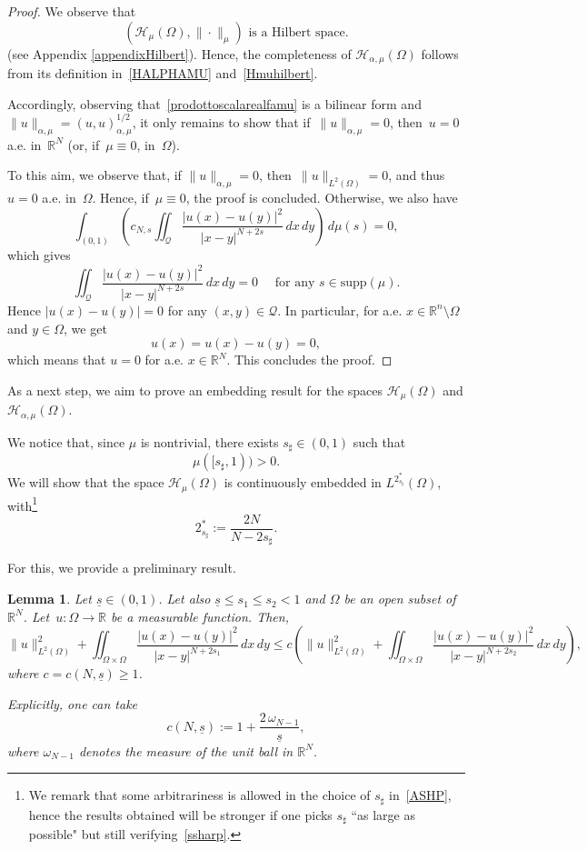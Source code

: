 \documentclass[12pt,a4paper,intlimits,sumlimits]{amsart}
\def \R {\mathbb{R}}
\def \Q {\mathcal Q}
\theoremstyle{definition}
\theoremstyle{plain}
\newtheorem{lemma}[definition]{Lemma}
\numberwithin{equation}{section}
\renewcommand{\le}{\leqslant}
\renewcommand{\ge}{\geqslant}
\begin{document}
\begin{proof}
We observe that
\begin{equation}\label{Hmuhilbert}
(\mathcal{H}_\mu(\Omega), \|\cdot\|_{\mu}) \mbox{ is a Hilbert space.}
\end{equation}
(see Appendix \ref{appendixHilbert}).
Hence, the completeness of $\mathcal{H}_{\alpha,\mu}(\Omega)$ follows from its
definition in~\eqref{HALPHAMU} and~\ref{Hmuhilbert}.

Accordingly, observing that~\eqref{prodottoscalarealfamu} is a bilinear form and~$\|u\|_{\alpha,\mu}=(u,u)_{\alpha,\mu}^{1/2}$, it only remains to show that if~$\|u\|_{\alpha,\mu}=0$, then~$u=0$ a.e. in~$\R^N$ (or, if~$\mu\equiv 0$, in~$\Omega$).

To this aim, we observe that, if $\|u\|_{\alpha,\mu}=0$, then~$\|u\|_{L^2(\Omega)}=0$, and thus~$u=0$ a.e. in~$\Omega$. Hence, if~$\mu\equiv 0$, the proof is concluded. Otherwise, we also have
\[
\int_{(0,1)} \left(c_{N,s}\iint_\Q \frac{|u(x)-u(y)|^2}{|x-y|^{N+2s}}\,dx\,dy\right)\,d\mu(s) =0,
\]
which gives
\[
\iint_\Q \frac{|u(x)-u(y)|^2}{|x-y|^{N+2s}}\,dx\,dy =0 \quad\mbox{ for any } s\in\mbox{supp}(\mu).
\]
Hence $|u(x)-u(y)|=0$ for any $(x, y)\in\Q$. In particular, for a.e. $x\in \R^n\setminus\Omega$ and $y\in\Omega$, we get
\[
u(x) = u(x) -u(y)=0,
\]
which means that $u=0$ for a.e. $x\in\R^N$. This concludes the proof.
\end{proof}

As a next step, we aim to prove an embedding result for the spaces $\mathcal{H}_\mu(\Omega)$ and $\mathcal{H}_{\alpha,\mu}(\Omega)$. 

We notice that, since $\mu$ is nontrivial,  there exists $s_\sharp\in (0, 1)$ such that
\begin{equation}\label{ssharp}
\mu([s_\sharp, 1))>0.
\end{equation}
We will show that the space $\mathcal H_\mu(\Omega)$ is continuously embedded in $L^{2^*_{s_\sharp}}(\Omega)$, with\footnote{We remark that some arbitrariness is allowed in the choice of $s_\sharp$ in~\eqref{ASHP}, hence the results obtained will be stronger if one picks $s_\sharp$ ``as large as possible" but still verifying~\eqref{ssharp}.}
\begin{equation}\label{ASHP}2^*_{s_\sharp}:=\frac{2N}{N-2s_\sharp}.\end{equation}

For this, we provide a preliminary result.

\begin{lemma}\label{lemmaGG2.1}
Let $\underline s\in (0, 1)$. Let also $\underline s\le s_1\le s_2 < 1$ and $\Omega$ be an open subset of $\R^N$. Let~$u:\Omega\to \R$ be a measurable function. Then,
\[
\|u\|_{L^2(\Omega)}^2 +\iint_{\Omega\times \Omega}\frac{|u(x)-u(y)|^2}{|x-y|^{N+2s_1}}\,dx\,dy\le c\left(\|u\|_{L^2(\Omega)}^2 +\iint_{\Omega\times \Omega}\frac{|u(x)-u(y)|^2}{|x-y|^{N+2s_2}}\,dx\,dy\right),
\]
where $c=c(N, \underline s)\ge 1$.

Explicitly, one can take
\[
c(N, \underline s):= 1+\frac{2 \,\omega_{N-1}}{\underline s},
\]
where $\omega_{N-1}$ denotes the measure of the unit ball in $\R^{N}$.
\end{lemma}
\end{document}

